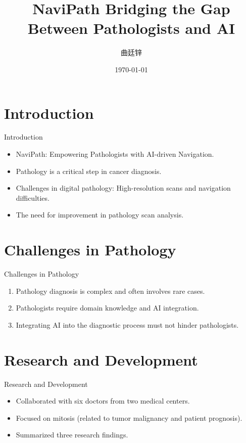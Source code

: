 \documentclass{beamer}
\title{NaviPath \newline\newline Bridging the Gap Between Pathologists and AI}
\author{曲廷锌}
\date{\today}
\begin{document}
\frame{\titlepage}

\section{Introduction}

\begin{frame}{Introduction}
    \begin{itemize}
        \item NaviPath: Empowering Pathologists with AI-driven Navigation.
        \item Pathology is a critical step in cancer diagnosis.
        \item Challenges in digital pathology: High-resolution scans and navigation difficulties.
        \item The need for improvement in pathology scan analysis.
    \end{itemize}
\end{frame}

\section{Challenges in Pathology}

\begin{frame}{Challenges in Pathology}
    \begin{enumerate}
        \item Pathology diagnosis is complex and often involves rare cases.
        \item Pathologists require domain knowledge and AI integration.
        \item Integrating AI into the diagnostic process must not hinder pathologists.
    \end{enumerate}
\end{frame}

\section{Research and Development}

\begin{frame}{Research and Development}
    \begin{itemize}
        \item Collaborated with six doctors from two medical centers.
        \item Focused on mitosis (related to tumor malignancy and patient prognosis).
        \item Summarized three research findings.
    \end{itemize}
\end{frame}
\end{document}
